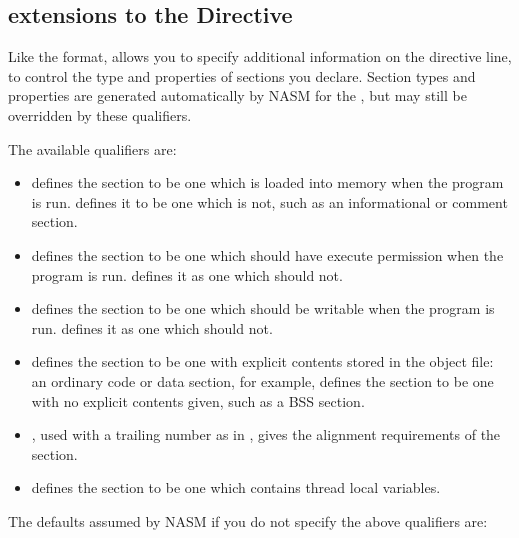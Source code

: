 \subsection{ extensions to the  Directive}
\label{subsec:elfsect}

Like the  format,  allows you to specify additional
information on the  directive line, to control the type
and properties of sections you declare. Section types and properties
are generated automatically by NASM for the , but may still be overridden by these qualifiers.

The available qualifiers are:

\begin{itemize}
    \item{ defines the section to be one which is loaded into
        memory when the program is run.  defines it to be one
        which is not, such as an informational or comment section.}

    \item{ defines the section to be one which should have execute
        permission when the program is run.  defines it as one
        which should not.}

    \item{ defines the section to be one which should be writable
        when the program is run.  defines it as one which should
        not.}

    \item{ defines the section to be one with explicit contents
        stored in the object file: an ordinary code or data section, for
        example,  defines the section to be one with no explicit
        contents given, such as a BSS section.}

    \item{, used with a trailing number as in , gives the
        alignment
        requirements of the section.}

    \item{ defines the section to be one which contains
        thread local variables.}
\end{itemize}

The defaults assumed by NASM if you do not specify the above
qualifiers are:
  
  
  

